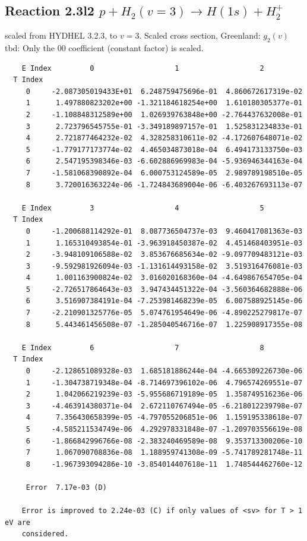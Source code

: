\documentclass[12pt,dvipdfmx]{article}
\begin{document}
\subsection{
Reaction 2.3l2 $   p + H_2(v=3) \rightarrow H(1s) + H_2^+$}
scaled from HYDHEL 3.2.3, to $v=3$. Scaled cross section, Greenland: $g_2(v)$
tbd:
Only the 00 coefficient (constant factor) is scaled.


\begin{small}\begin{verbatim}
    E Index         0                   1                   2
  T Index
     0     -2.087305019433E+01  6.248759475696e-01  4.860672617319e-02
     1      1.497880823202e+00 -1.321184618254e+00  1.610180305377e-01
     2     -1.108848312589e+00  1.026939763848e+00 -2.764437632008e-01
     3      2.723796545755e-01 -3.349189897157e-01  1.525831234833e-01
     4      2.721877464232e-02  4.328258310611e-02 -4.172607648071e-02
     5     -1.779177173774e-02  4.465034873018e-04  6.494173133750e-03
     6      2.547195398346e-03 -6.602886969983e-04 -5.936946344163e-04
     7     -1.581068390892e-04  6.000753124589e-05  2.989789198510e-05
     8      3.720016363224e-06 -1.724843689004e-06 -6.403267693113e-07

    E Index         3                   4                   5
  T Index
     0     -1.200688114292e-01  8.087736504737e-03  9.460417081363e-03
     1      1.165310493854e-01 -3.963918450387e-02  4.451468403951e-03
     2     -3.948109106588e-02  3.853676685634e-02 -9.097709483121e-03
     3     -9.592981926094e-03 -1.131614493158e-02  3.519316476081e-03
     4      1.001163900824e-02  3.016020168360e-04 -4.649867654705e-04
     5     -2.726517864643e-03  3.947434451322e-04 -3.560364682888e-06
     6      3.516907384191e-04 -7.253981468239e-05  6.007588925145e-06
     7     -2.210901325776e-05  5.074761954649e-06 -4.890225279817e-07
     8      5.443461456508e-07 -1.285040546716e-07  1.225908917355e-08

    E Index         6                   7                   8
  T Index
     0     -2.128651089328e-03  1.685181886244e-04 -4.665309226730e-06
     1     -1.304738719348e-04 -8.714697396102e-06  4.796574269551e-07
     2      1.042066219239e-03 -5.955686719189e-05  1.358749516236e-06
     3     -4.463914380371e-04  2.672110767494e-05 -6.218012239798e-07
     4      7.356430658399e-05 -4.797055206851e-06  1.159195338618e-07
     5     -4.585211534749e-06  4.292978331848e-07 -1.209703556619e-08
     6     -1.866842996766e-08 -2.383240469589e-08  9.353713300206e-10
     7      1.067090708836e-08  1.188959741308e-09 -5.741789281748e-11
     8     -1.967393094286e-10 -3.854014407618e-11  1.748544462760e-12

     Error  7.17e-03 (D)

    Error is improved to 2.24e-03 (C) if only values of <sv> for T > 1 eV are
    considered.
\end{verbatim}\end{small}
\newpage
\end{document}
